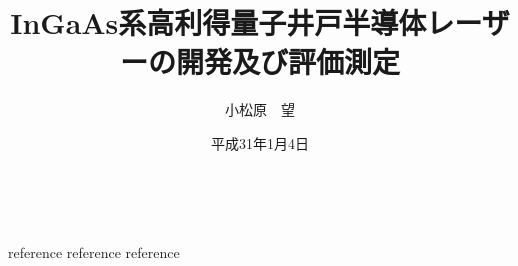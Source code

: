 \documentclass{jreport}
\title{InGaAs系高利得量子井戸半導体レーザーの開発及び評価測定}
\author{小松原　望}
\date{平成31年1月4日}
\begin{document}
\maketitle			%
\tableofcontents 	%
\listoffigures 		%
\listoftables　		%


\begin{thebibliography}{99}
 reference
 reference
 reference
%
\end{thebibliography}


\end{document}
